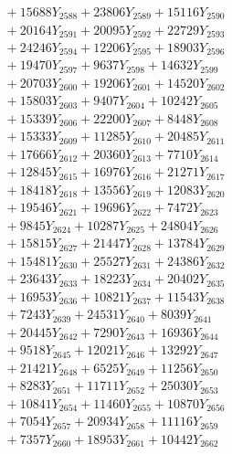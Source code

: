 \documentclass[a4paper,10pt]{article}
\begin{document}
{\begin{align}
&\;  + 15688 Y_{2588} + 23806 Y_{2589} + 15116 Y_{2590} \\[0.3ex]
&\;  + 20164 Y_{2591} + 20095 Y_{2592} + 22729 Y_{2593} \\[0.3ex]
&\;  + 24246 Y_{2594} + 12206 Y_{2595} + 18903 Y_{2596} \\[0.3ex]
&\;  + 19470 Y_{2597} + 9637 Y_{2598} + 14632 Y_{2599} \\[0.3ex]
&\;  + 20703 Y_{2600} + 19206 Y_{2601} + 14520 Y_{2602} \\[0.3ex]
&\;  + 15803 Y_{2603} + 9407 Y_{2604} + 10242 Y_{2605} \\[0.3ex]
&\;  + 15339 Y_{2606} + 22200 Y_{2607} + 8448 Y_{2608} \\[0.5ex]\allowbreak
&\;  + 15333 Y_{2609} + 11285 Y_{2610} + 20485 Y_{2611} \\[0.3ex]
&\;  + 17666 Y_{2612} + 20360 Y_{2613} + 7710 Y_{2614} \\[0.3ex]
&\;  + 12845 Y_{2615} + 16976 Y_{2616} + 21271 Y_{2617} \\[0.3ex]
&\;  + 18418 Y_{2618} + 13556 Y_{2619} + 12083 Y_{2620} \\[0.3ex]
&\;  + 19546 Y_{2621} + 19696 Y_{2622} + 7472 Y_{2623} \\[0.3ex]
&\;  + 9845 Y_{2624} + 10287 Y_{2625} + 24804 Y_{2626} \\[0.3ex]
&\;  + 15815 Y_{2627} + 21447 Y_{2628} + 13784 Y_{2629} \\[0.3ex]
&\;  + 15481 Y_{2630} + 25527 Y_{2631} + 24386 Y_{2632} \\[0.3ex]
&\;  + 23643 Y_{2633} + 18223 Y_{2634} + 20402 Y_{2635} \\[0.3ex]
&\;  + 16953 Y_{2636} + 10821 Y_{2637} + 11543 Y_{2638} \\[0.5ex]\allowbreak
&\;  + 7243 Y_{2639} + 24531 Y_{2640} + 8039 Y_{2641} \\[0.3ex]
&\;  + 20445 Y_{2642} + 7290 Y_{2643} + 16936 Y_{2644} \\[0.3ex]
&\;  + 9518 Y_{2645} + 12021 Y_{2646} + 13292 Y_{2647} \\[0.3ex]
&\;  + 21421 Y_{2648} + 6525 Y_{2649} + 11256 Y_{2650} \\[0.3ex]
&\;  + 8283 Y_{2651} + 11711 Y_{2652} + 25030 Y_{2653} \\[0.3ex]
&\;  + 10841 Y_{2654} + 11460 Y_{2655} + 10870 Y_{2656} \\[0.3ex]
&\;  + 7054 Y_{2657} + 20934 Y_{2658} + 11116 Y_{2659} \\[0.3ex]
&\;  + 7357 Y_{2660} + 18953 Y_{2661} + 10442 Y_{2662} \\[0.3ex]

\end{align}}
\end{document}
